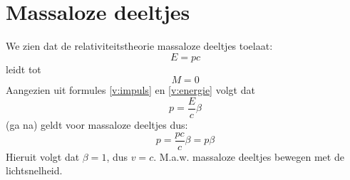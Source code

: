 \section{Massaloze deeltjes}
We zien dat de relativiteitstheorie massaloze deeltjes toelaat:
\begin{displaymath}
E = pc
\end{displaymath}
leidt tot
\begin{displaymath}
M = 0
\end{displaymath}
Aangezien uit formules \ref{v:impuls} en \ref{v:energie} volgt dat
\begin{displaymath}
p = \frac{E}{c} \beta 
\end{displaymath}
(ga na) geldt voor massaloze deeltjes dus:
\begin{displaymath}
p = \frac{pc}{c} \beta = p \beta
\end{displaymath}
Hieruit volgt dat $\beta = 1$, dus $v = c$.
M.a.w. massaloze deeltjes bewegen met de lichtsnelheid.


